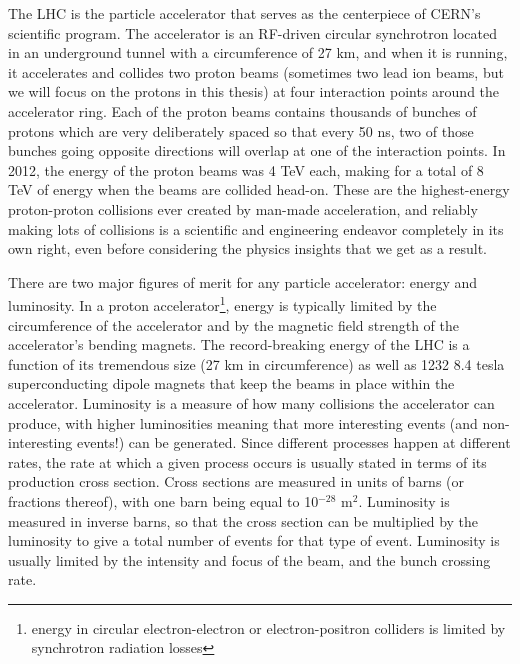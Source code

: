 The LHC is the particle accelerator that serves as the centerpiece of CERN's scientific program.  The accelerator is 
an RF-driven circular synchrotron located in an underground tunnel with a circumference of 27 km, and when 
it is running, it accelerates and collides two proton beams (sometimes two lead ion beams, but we will 
focus on the protons in this thesis) at four interaction points around the accelerator ring.  Each of the proton beams 
contains thousands of bunches of protons which are very deliberately spaced so that every 50 ns, two 
of those bunches going opposite directions will overlap at one of the interaction points.  In 2012, the energy
of the proton beams was 4 TeV each, making for a total of 8 TeV of energy when the beams are collided head-on.
These are the highest-energy proton-proton collisions ever created by man-made acceleration, and reliably making lots of
collisions is a scientific and engineering endeavor completely in its own right, even before considering
the physics insights that we get as a result.


There are two major figures of merit for any particle accelerator: energy and luminosity.  In a
proton accelerator\footnote{energy in circular electron-electron or electron-positron colliders is limited
by synchrotron radiation losses}, energy is typically limited 
by the circumference of the accelerator and by the magnetic field strength of the accelerator's bending magnets.  
The record-breaking energy of the LHC is a function of its tremendous size (27 km in circumference) as 
well as 1232 8.4 tesla superconducting dipole magnets that keep the beams in place within the accelerator.  Luminosity 
 is a measure of how many collisions the accelerator can produce, with higher luminosities meaning that more 
interesting events (and non-interesting events!) can be generated.  Since different processes happen at different rates, 
the rate at which a given process occurs is usually stated in terms of its production cross section.  
Cross sections are measured in units of barns (or fractions thereof), with one barn being equal to 10$^{-28}$ m$^2$.  
Luminosity is measured in inverse barns, so that the cross section 
can be multiplied by the luminosity to give a total number of events for that type of event.  Luminosity 
is usually limited by the intensity and focus of the beam, and the bunch crossing rate.


